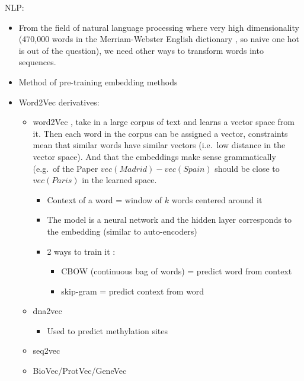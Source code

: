 \documentclass[
  11pt,
  twoside,
  BCOR=10mm,
  listof=totoc]{scrbook}
\providecommand{\tightlist}{%
  \setlength{\itemsep}{0pt}\setlength{\parskip}{0pt}}
\begin{document}
NLP:

\begin{itemize}
\item
  From the field of natural language processing where very high dimensionality (470,000 words in the Merriam-Webster English dictionary \autocite{HowManyWords}, so naive one hot is out of the question), we need other ways to transform words into sequences.
\item
  Method of pre-training embedding methods
\item
  Word2Vec derivatives:

  \begin{itemize}
  \item
    word2Vec \autocite{mikolovEfficientEstimationWord2013,mikolovDistributedRepresentationsWords2013}, take in a large corpus of text and learns a vector space from it. Then each word in the corpus can be assigned a vector, constraints mean that similar words have similar vectors (i.e.~low distance in the vector space). And that the embeddings make sense grammatically (e.g.~of the Paper \(vec(Madrid) - vec(Spain)\) should be close to \(vec(Paris)\) in the learned space.

    \begin{itemize}
    \item
      Context of a word = window of \(k\) words centered around it
    \item
      The model is a neural network and the hidden layer corresponds to the embedding (similar to auto-encoders)
    \item
      2 ways to train it \autocite{goldbergWord2vecExplainedDeriving2014}:

      \begin{itemize}
      \item
        CBOW (continuous bag of words) = predict word from context
      \item
        skip-gram = predict context from word
      \end{itemize}
    \end{itemize}
  \item
    dna2vec \autocite{ngDna2vecConsistentVector2017}

    \begin{itemize}
    \tightlist
    \item
      Used to predict methylation sites \autocite{liangHyb4mCHybridDNA2vecbased2022}
    \end{itemize}
  \item
    seq2vec \autocite{kimothiDistributedRepresentationsBiological2016}
  \item
    BioVec/ProtVec/GeneVec \autocite{asgariContinuousDistributedRepresentation2015}


\end{itemize}
\end{itemize}
\end{document}
